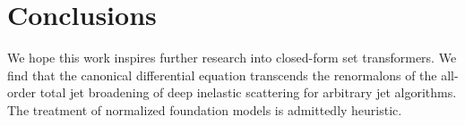 \section{Conclusions}\label{sec:conclusions}

We hope this work inspires further research into closed-form set
transformers. We find that the canonical differential equation
transcends the renormalons of the all-order total jet broadening of deep
inelastic scattering for arbitrary jet algorithms. The treatment of
normalized foundation models is admittedly heuristic.

